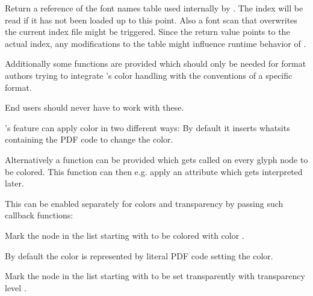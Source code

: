             Return a reference of the font names table used internally
            by . The index will be read if it
            has not been loaded up to this point. Also a font scan that
            overwrites the current index file might be triggered. Since
            the return value points to the actual index, any
            modifications to the table might influence runtime behavior
            of .
  \endaltitem

\endfunctionlist

\endsubsubsection

\endsubsection


Additionally some functions are provided which should only be needed for
format authors trying to integrate 's color handling
with the conventions of a specific format.

End users should never have to work with these.

\endsubsubsection


's  feature can apply color in two
different ways: By default it inserts  whatsits
containing the PDF code to change the color.

Alternatively a function can be provided which gets called on every glyph
node to be colored. This function can then e.g. apply an attribute which gets
interpreted later.

This can be enabled separately for colors and transparency by passing such
callback functions:

\beginfunctionlist

            Mark the node  in the list starting with 
            to be colored with color .

            By default the color is represented by literal PDF code setting the
            color.
  \endaltitem

            Mark the node  in the list starting with 
            to be set transparently with transparency level .

